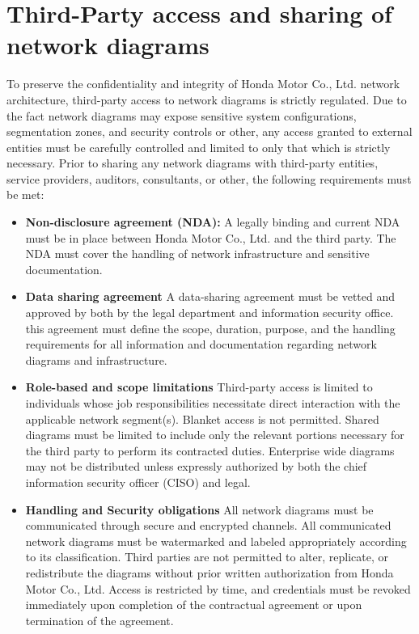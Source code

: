 \section{Third-Party access and sharing of network diagrams}
To preserve the confidentiality and integrity of Honda Motor Co., Ltd. network architecture, third-party access to network diagrams is strictly regulated. Due to the fact network diagrams may expose sensitive system configurations, segmentation zones, and security controls or other, any access granted to external entities must be carefully controlled and limited to only that which is strictly necessary. Prior to sharing any network diagrams with third-party entities, service providers, auditors, consultants, or other, the following requirements must be met:
\begin{itemize}
    \item \textbf{Non-disclosure agreement (NDA):}
    A legally binding and current NDA must be in place between Honda Motor Co., Ltd. and the third party. The NDA must cover the handling of network infrastructure and sensitive documentation.
    \item \textbf{Data sharing agreement}
    A data-sharing agreement must be vetted and approved by both by the legal department and information security office. this agreement must define the scope, duration, purpose, and the handling requirements for all information and documentation regarding network diagrams and infrastructure.
    \item \textbf{Role-based and scope limitations}
    Third-party access is limited to individuals whose job responsibilities necessitate direct interaction with the applicable network segment(s). Blanket access is not permitted. Shared diagrams must be limited to include only the relevant portions necessary for the third party to perform its contracted duties. Enterprise wide diagrams may not be distributed unless expressly authorized by both the chief information security officer (CISO) and legal.
    \item \textbf{Handling and Security obligations}
    All network diagrams must be communicated through secure and encrypted channels. All communicated network diagrams must be watermarked and labeled appropriately according to its classification. Third parties are not permitted to alter, replicate, or redistribute the diagrams without prior written authorization from Honda Motor Co., Ltd. Access is restricted by time, and credentials must be revoked immediately upon completion of the contractual agreement or upon termination of the agreement.

\end{itemize}
